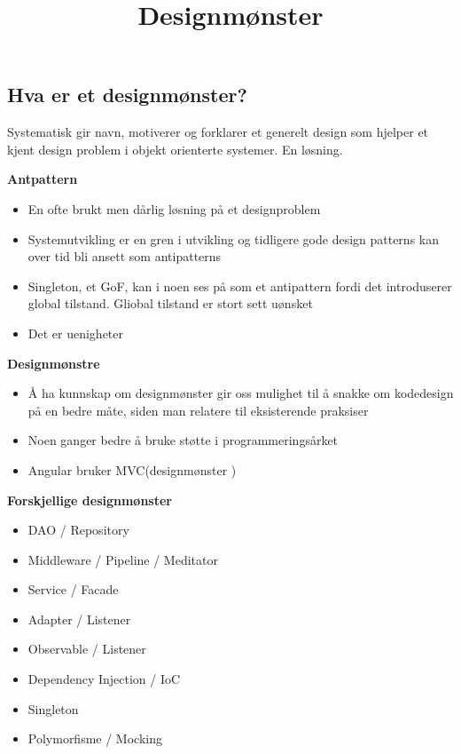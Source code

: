 \documentclass{article}
\title{Designmønster}
\begin{document}
    \begin{flushleft}
        \section{Hva er et designmønster?}
        Systematisk gir navn, motiverer og forklarer et generelt design som hjelper et kjent design problem i objekt orienterte systemer. En løsning. \par 
        \bigskip

        \textbf{Antpattern}\par
        \begin{itemize}
            \item En ofte brukt men dårlig løsning på et designproblem
            \item Systemutvikling er en gren i utvikling og tidligere gode design patterns kan over tid bli ansett som antipatterns
            \item Singleton, et GoF, kan i noen ses på som et antipattern fordi det introduserer global tilstand. Gliobal tilstand er stort sett uønsket
            \item Det er uenigheter
        \end{itemize}

        \textbf{Designmønstre}\par 
        \begin{itemize}
            \item Å ha kunnskap om designmønster gir oss mulighet til å snakke om kodedesign på en bedre måte, siden man relatere til eksisterende praksiser
            \item Noen ganger bedre å bruke støtte i programmeringsårket
            \item Angular bruker MVC(designmønster )
        \end{itemize}

        \textbf{Forskjellige designmønster}
        \begin{itemize}
            \item DAO / Repository
            \item Middleware / Pipeline / Meditator
            \item Service / Facade
            \item Adapter / Listener
            \item Observable / Listener
            \item Dependency Injection / IoC 
            \item Singleton 
            \item Polymorfisme / Mocking 
        \end{itemize}


\end{flushleft}
\end{document}
